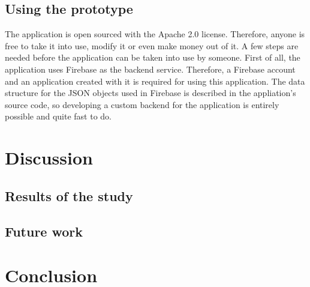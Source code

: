 \subsection{Using the prototype}

The application is open sourced with the Apache 2.0 license. Therefore, anyone is free to take it into use, modify it or even make money out of it. A few steps are needed before the application can be taken into use by someone. First of all, the application uses Firebase as the backend service. Therefore, a Firebase account and an application created with it is required for using this application. The data structure for the JSON objects used in Firebase is described in the appliation's source code, so developing a custom backend for the application is entirely possible and quite fast to do.

\section{Discussion}

\subsection{Results of the study}

\subsection{Future work}

\section{Conclusion}

